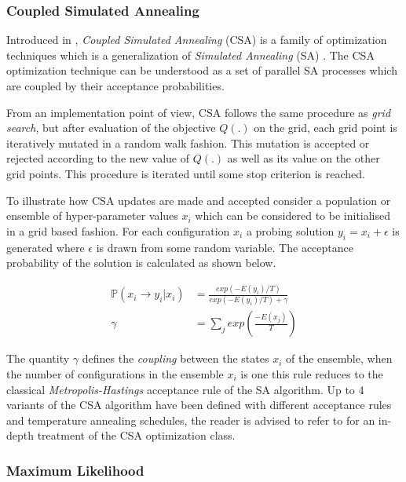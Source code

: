 \documentclass{article}
\begin{document}
\subsubsection*{Coupled Simulated Annealing}

Introduced in \citet{Xavier-De-Souza2010}, \emph{Coupled Simulated Annealing} (CSA) is a family of optimization techniques which is a generalization of \emph{Simulated Annealing} (SA) \citep{Kirkpatrick671}. The CSA optimization technique can be understood as a set of parallel SA processes which are coupled by their acceptance probabilities.

From an implementation point of view, CSA follows the same procedure as \emph{grid search}, but after evaluation of the objective $Q(.)$ on the grid, each grid point is iteratively mutated in a random walk fashion. This mutation is accepted or rejected according to the new value of $Q(.)$ as well as its value on the other grid points. This procedure is iterated until some stop criterion is reached.

To illustrate how CSA updates are made and accepted consider a population or ensemble of hyper-parameter values ${x_i}$ which can be considered to be initialised in a grid based fashion. For each configuration $x_i$ a probing solution $y_i = x_i + \epsilon$ is generated where $\epsilon$ is drawn from some random variable. The acceptance probability of the solution is calculated as shown below.

\begin{align*}
  \mathbb{P}(x_i \rightarrow y_i | {x_i}) & = \frac{exp(-E(y_i)/T)}{exp(-E(y_i)/T) + \gamma} \\
  \gamma & = \sum_{j}{exp \left ( \frac{-E(x_j)}{T} \right )}
\end{align*}

The quantity $\gamma$ defines the \emph{coupling} between the states ${x_i}$ of the ensemble, when the number of configurations in the ensemble $x_i$ is one this rule reduces to the classical \emph{Metropolis-Hastings} acceptance rule of the SA algorithm. Up to 4 variants of the CSA algorithm have been defined with different acceptance rules and temperature annealing schedules, the reader is advised to refer to \citet{Xavier-De-Souza2010} for an in-depth treatment of the CSA optimization class.  

\subsubsection*{Maximum Likelihood} 
\end{document}
